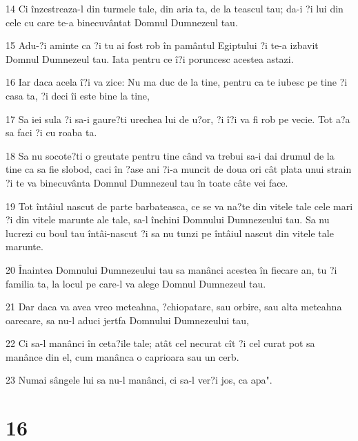 \par 14 Ci înzestreaza-l din turmele tale, din aria ta, de la teascul tau; da-i ?i lui din cele cu care te-a binecuvântat Domnul Dumnezeul tau.
\par 15 Adu-?i aminte ca ?i tu ai fost rob în pamântul Egiptului ?i te-a izbavit Domnul Dumnezeul tau. Iata pentru ce î?i poruncesc acestea astazi.
\par 16 Iar daca acela î?i va zice: Nu ma duc de la tine, pentru ca te iubesc pe tine ?i casa ta, ?i deci îi este bine la tine,
\par 17 Sa iei sula ?i sa-i gaure?ti urechea lui de u?or, ?i î?i va fi rob pe vecie. Tot a?a sa faci ?i cu roaba ta.
\par 18 Sa nu socote?ti o greutate pentru tine când va trebui sa-i dai drumul de la tine ca sa fie slobod, caci în ?ase ani ?i-a muncit de doua ori cât plata unui strain ?i te va binecuvânta Domnul Dumnezeul tau în toate câte vei face.
\par 19 Tot întâiul nascut de parte barbateasca, ce se va na?te din vitele tale cele mari ?i din vitele marunte ale tale, sa-l închini Domnului Dumnezeului tau. Sa nu lucrezi cu boul tau întâi-nascut ?i sa nu tunzi pe întâiul nascut din vitele tale marunte.
\par 20 Înaintea Domnului Dumnezeului tau sa manânci acestea în fiecare an, tu ?i familia ta, la locul pe care-l va alege Domnul Dumnezeul tau.
\par 21 Dar daca va avea vreo meteahna, ?chiopatare, sau orbire, sau alta meteahna oarecare, sa nu-l aduci jertfa Domnului Dumnezeului tau,
\par 22 Ci sa-l manânci în ceta?ile tale; atât cel necurat cît ?i cel curat pot sa manânce din el, cum manânca o caprioara sau un cerb.
\par 23 Numai sângele lui sa nu-l manânci, ci sa-l ver?i jos, ca apa".

\chapter{16}

